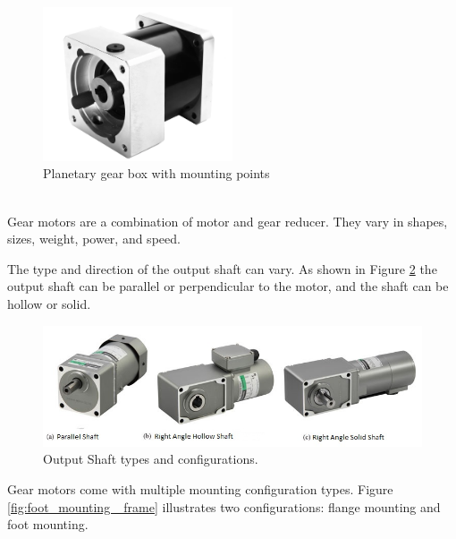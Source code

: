 \begin{figure}[H]
    \centering
    \includegraphics[width=0.5\textwidth]{Sections/LiteratureReview/img/drive/GearBox.PNG}
    \caption{Planetary gear box with mounting points \cite{banggood_nema_nodate}}
    \label{fig:gear_box}
\end{figure}

 \mbox{}\\

Gear motors are a combination of motor and gear reducer. They vary in shapes, sizes, weight, power, and speed. 

The type and direction of the output shaft can vary. As shown in Figure \ref{fig:output_shaft_gear_motor} the output shaft can be parallel or perpendicular to the motor, and the shaft can be hollow or solid. 

\begin{figure}[H]
    \centering
    \includegraphics[width=1\textwidth]{Sections/LiteratureReview/img/LegAssembly/OutputTypeGearMotor.jpg}
    \caption{Output Shaft types and configurations. \cite{essence_automation_products_2018}}
    \label{fig:output_shaft_gear_motor}
\end{figure}

Gear motors come with multiple mounting configuration types. Figure \ref{fig:foot_mounting _frame} illustrates two configurations: flange mounting and foot mounting. 


